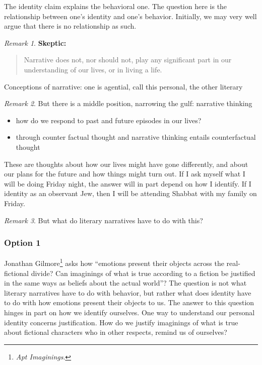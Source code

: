\documentclass[
  12pt,
]{book}
\theoremstyle{definition}
\theoremstyle{definition}
\theoremstyle{definition}
\theoremstyle{definition}
\theoremstyle{remark}
\newtheorem*{remark}{Remark}
\begin{document}
The identity claim explains the behavioral one. The question here is the relationship between one's identity and one's behavior. Initially, we may very well argue that there is no relationship as such.

\begin{remark}

\textbf{Skeptic:}

\begin{quote}
Narrative does not, nor should not, play any significant part in our understanding of our lives, or in living a life.
\end{quote}

\end{remark}

Conceptions of narrative: one is agential, call this personal, the other literary

\begin{remark}

But there is a middle position, narrowing the gulf: narrative thinking

\begin{itemize}
\item
  how do we respond to past and future episodes in our lives?
\item
  through counter factual thought and narrative thinking entails counterfactual thought
\end{itemize}

\end{remark}

These are thoughts about how our lives might have gone differently, and about our plans for the future and how things might turn out. If I ask myself what I will be doing Friday night, the answer will in part depend on how I identify. If I identity as an observant Jew, then I will be attending Shabbat with my family on Friday.

\begin{remark}
But what do literary narratives have to do with this?
\end{remark}

\subsubsection*{Option 1}\label{option-1}

Jonathan Gilmore\footnote{\emph{Apt {Imaginings}}.} asks how ``emotions present their objects across the real-fictional divide? Can imaginings of what is true according to a fiction be justified in the same ways as beliefs about the actual world''? The question is not what literary narratives have to do with behavior, but rather what does identity have to do with how emotions present their objects to us. The answer to this question hinges in part on how we identify ourselves. One way to understand our personal identity concerns justification. How do we justify imaginings of what is true about fictional characters who in other respects, remind us of ourselves?
\end{document}
